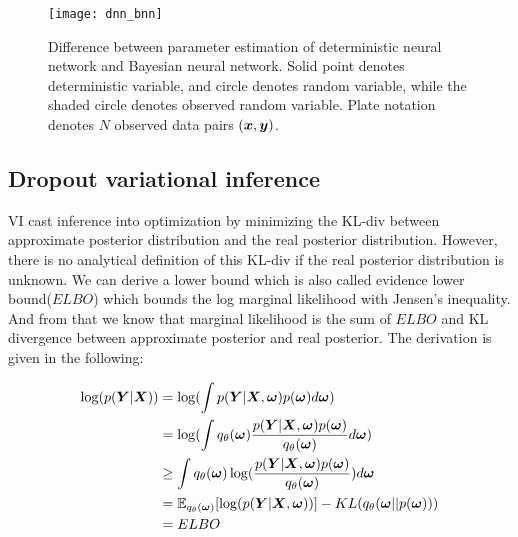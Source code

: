 \begin{figure}[H]
	\begin{center}
		\texttt{[image: dnn\_bnn]}
		\caption{Difference between parameter estimation of deterministic neural network and Bayesian neural network. Solid point denotes deterministic variable, and circle denotes random variable, while the shaded circle denotes observed random variable. Plate notation denotes $N$ observed data pairs $(\boldsymbol x, \boldsymbol y)$.}%
		\label{fig:dnn_bnn}
	\end{center}
\end{figure}

\subsection{Dropout variational inference}
VI cast inference into optimization by minimizing the KL-div between approximate posterior distribution and the real posterior distribution. However, there is no analytical definition of this KL-div if the real posterior distribution is unknown. We can derive a lower bound which is also called evidence lower bound($ELBO$) which bounds the log marginal likelihood with Jensen's inequality. And from that we know that marginal likelihood is the sum of $ELBO$ and KL divergence between approximate posterior and real posterior. The derivation is given in the following:

\begin{equation}\label{2.6}	
\begin{aligned}
\log(p(\boldsymbol{Y}|\boldsymbol{X})) & = \log(\int p(\boldsymbol{Y}| \boldsymbol{X}, \boldsymbol{\omega})  p(\boldsymbol{\omega})d\boldsymbol{\omega}) \\	 
& = \log(\int{q_{\theta}(\boldsymbol{\omega}) \frac{p(\boldsymbol{Y}| \boldsymbol{X}, \boldsymbol{\omega}) p(\boldsymbol{\omega})}{q_{\theta}(\boldsymbol{\omega})}d\boldsymbol{\omega}}) \\
& \geq \int q_{\theta}(\boldsymbol{\omega}) \log( \frac{p(\boldsymbol{Y}| \boldsymbol{X}, \boldsymbol{\omega}) p(\boldsymbol{\omega})}{q_{\theta}(\boldsymbol{\omega})}) d\boldsymbol{\omega} \\
& = \mathbb E_{q_{\theta}(\boldsymbol{\omega})}[\log(p(\boldsymbol{Y}| \boldsymbol{X}, \boldsymbol{\omega}))] -  KL(q_{\theta}(\boldsymbol{\omega}||p(\boldsymbol{\omega})))\\
& = ELBO
\end{aligned}
\end{equation}

